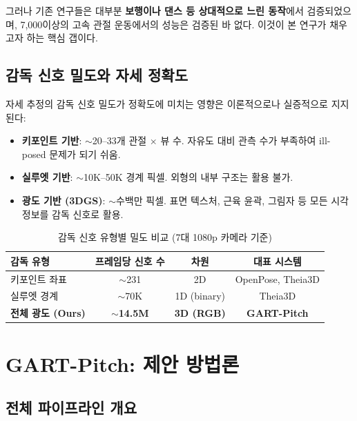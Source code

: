 \documentclass[11pt, a4paper]{report}
\begin{document}
그러나 기존 연구들은 대부분 \textbf{보행이나 댄스 등 상대적으로 느린 동작}에서 검증되었으며,
7,000\degps 이상의 고속 관절 운동에서의 성능은 검증된 바 없다.
이것이 본 연구가 채우고자 하는 핵심 갭이다.


\section{감독 신호 밀도와 자세 정확도}

자세 추정의 감독 신호 밀도가 정확도에 미치는 영향은 이론적으로나 실증적으로 지지된다:

\begin{itemize}[leftmargin=*]
  \item \textbf{키포인트 기반}: $\sim$20--33개 관절 $\times$ 뷰 수. 자유도 대비 관측 수가 부족하여
        ill-posed 문제가 되기 쉬움.
  \item \textbf{실루엣 기반}: $\sim$10K--50K 경계 픽셀. 외형의 내부 구조는 활용 불가.
  \item \textbf{광도 기반 (3DGS)}: $\sim$수백만 픽셀. 표면 텍스처, 근육 윤곽, 그림자 등
        모든 시각 정보를 감독 신호로 활용.
\end{itemize}

\begin{table}[H]
\centering
\caption{감독 신호 유형별 밀도 비교 (7대 1080p 카메라 기준)}
\label{tab:supervision_density}
\begin{tabular}{lccc}
\toprule
\textbf{감독 유형} & \textbf{프레임당 신호 수} & \textbf{차원} & \textbf{대표 시스템} \\
\midrule
키포인트 좌표 & $\sim$231 & 2D & OpenPose, Theia3D \\
실루엣 경계 & $\sim$70K & 1D (binary) & Theia3D \\
\textbf{전체 광도 (Ours)} & \textbf{$\sim$14.5M} & \textbf{3D (RGB)} & \textbf{GART-Pitch} \\
\bottomrule
\end{tabular}
\end{table}


\chapter{GART-Pitch: 제안 방법론}
\label{ch:method}

\section{전체 파이프라인 개요}
\end{document}

